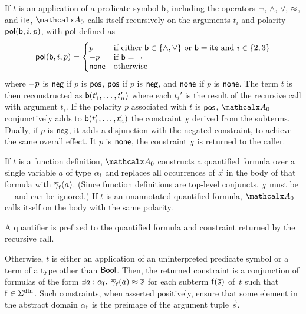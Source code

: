 If $t$ is an application of a predicate symbol $\mathsf{b}$, including the
operators ${\oldneg}$, ${\wedge}$, ${\vee}$, ${\approx}$, and ${\mathsf{ite}}$,
$\conv_0$ calls itself recursively on the arguments $t_i$ and polarity $\mathsf{pol}(
\mathsf{b}, i, p )$, with $\mathsf{pol}$ defined as
\[\pol( \boolop, i, p ) =
\begin{cases}
p & \text{if either $\boolop \in \{{\wedge}, {\vee}\}$ or $\boolop = \lite$ and $i \in \{2, 3\}$} \\[-\jot]
\pnegate p & \text{if $\boolop = {\neg}$} \\[-\jot]
\pnone & \text{otherwise}
\end{cases}\]
where $- p$ is $\mathsf{neg}$ if $p$ is $\mathsf{pos}$, $\mathsf{pos}$
if $p$ is $\mathsf{neg}$, and $\mathsf{none}$ if $p$ is $\mathsf{none}$.
The term $t$ is then reconstructed as $\mathsf{b}(t_1',\ldots,t_n')$ 
where each $t_i'$ is the result of the recursive call with argument $t_i$. 
If the polarity $p$ associated with $t$ is $\mathsf{pos}$, 
$\conv_0$ conjunctively adds to $\mathsf{b}(t_1',\ldots,t_n')$ the constraint $\chi$ derived from
the subterms. Dually, if $p$ is $\mathsf{neg}$, it adds a
disjunction with the negated constraint, to achieve the same overall effect.
It $p$ is $\mathsf{none}$, the constraint $\chi$ is
returned to the caller.
%
\begin{rep}\par\end{rep}
%
If $t$ is a function definition, %
$\conv_0$ constructs a quantified formula over a single variable
$a$ of type $\alpha_{\mathsf{f}}$ and replaces all occurrences of $\vec x$ in
the body of that formula with $\overline{\gamma}_{\mathsf{f}}( a )$. 
(Since function definitions are top-level conjuncts, %
$\chi$ must be $\top$ and can be ignored.)
%
If $t$ is an unannotated quantified formula, $\conv_0$ calls itself
on the body with the same polarity. \begin{rep}A quantifier is prefixed to the
quantified formula and constraint returned by the recursive call.\end{rep}
Otherwise, $t$ is either an application of an uninterpreted predicate symbol or a term
of a type other than $\mathsf{Bool}$. Then, the returned constraint is a conjunction of
formulas of the form $\exists a : {\alpha_{\mathsf{f}}}.\;\, \overline{\gamma}_{\mathsf{f}}(
a ) \approx \overline{s}$ for each subterm $\mathsf{f}( \overline{s} )$ of~$t$ such that $\con{f}
\in \sfundefs{\Sigma}$. Such constraints, when asserted positively, ensure that
some element in the abstract domain $\alpha_{\mathsf{f}}$ is the preimage of
the argument tuple $\vec s$. %

